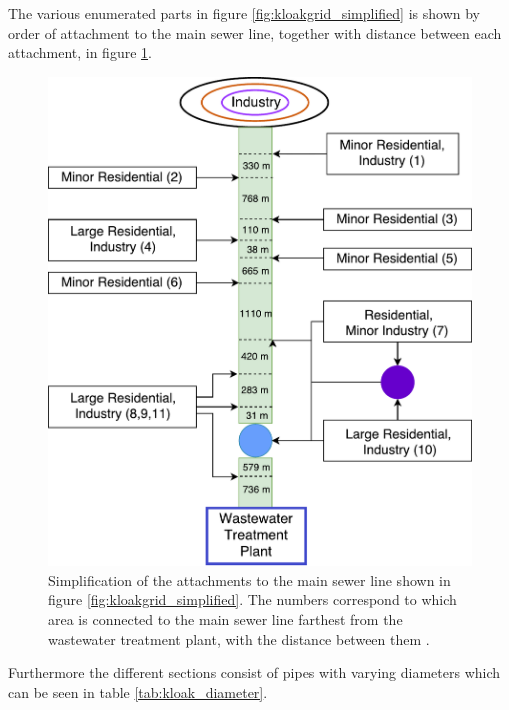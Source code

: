 \newpage

The various enumerated parts in figure \ref{fig:kloakgrid_simplified} is shown by order of attachment to the main sewer line, together with distance between each attachment, in figure \ref{fig:sewer_line_diagram}. 

\begin{figure}[H]
\centering
\includegraphics[width=0.6 \textwidth]{report/system_overview/pictures/sewer_line_diagram.pdf}
\caption{Simplification of the attachments to the main sewer line shown in figure \ref{fig:kloakgrid_simplified}. The numbers correspond to which area is connected to the main sewer line farthest from the wastewater treatment plant, with the distance between them \cite{GIS_kort}.}
\label{fig:sewer_line_diagram}
\end{figure}

Furthermore the different sections consist of pipes with varying diameters which can be seen in table \ref{tab:kloak_diameter}.



